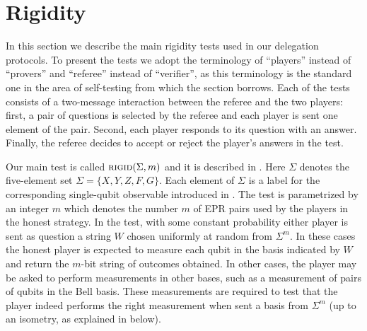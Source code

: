 \documentclass{toc}
\newcommand{\rigid}{\textsc{rigid}}
\begin{document}
 



















\section{Rigidity}
\label{sec:intro-rigidity}



In this section we describe the main rigidity tests used in our delegation protocols. To present the tests we adopt the terminology of ``players'' instead of ``provers'' and ``referee'' instead of ``verifier'', as this terminology is the standard one in the area of self-testing from which the section borrows. Each of the tests consists of a two-message interaction between the referee and the two players: first, a pair of questions is selected by the referee and each player is sent one element of the pair. Second, each player responds to its question with an answer. Finally, the referee decides to accept or reject the player's answers in the test. 

Our main test is called $\rigid(\Sigma,m)$ and it is described in . Here $\Sigma$ denotes the five-element set $\Sigma = \{X,Y,Z,F,G\}$. Each element of $\Sigma$ is a label for the corresponding single-qubit observable introduced in . The test is parametrized by an integer $m$ which denotes the number $m$ of EPR pairs used by the players in the honest strategy. In the test, with some constant probability either player is sent as question a string $W$ chosen uniformly at random from $\Sigma^m$. In these cases the honest player is expected to measure each qubit in the basis indicated by $W$ and return the $m$-bit string of outcomes obtained. In other cases, the player may be asked to perform measurements in other bases, such as a measurement of pairs of qubits in the Bell basis. These measurements are required to test that the player indeed performs the right measurement when sent a basis from $\Sigma^m$ (up to an isometry, as explained in  below). 
\end{document}

